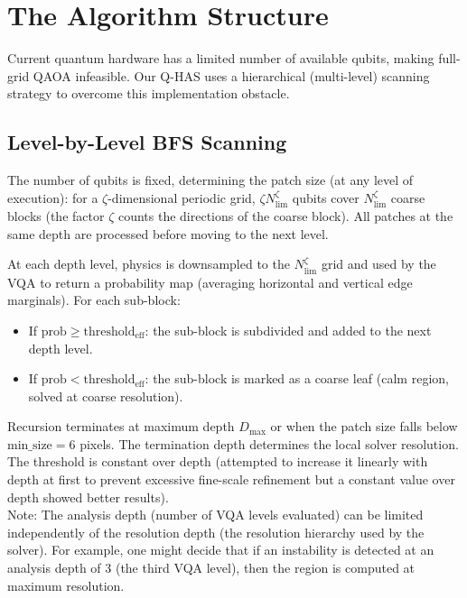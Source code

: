 \documentclass[12pt, a4paper, oneside]{report}
\begin{document}
\chapter{The Algorithm Structure}
\label{chap:algorithm}

Current quantum hardware has a limited number of available qubits, making full-grid QAOA infeasible. Our Q-HAS uses a hierarchical (multi-level) scanning strategy to overcome this implementation obstacle.

\section{Level-by-Level BFS Scanning}

The number of qubits is fixed, determining the patch size (at any level of execution): for a $\zeta$-dimensional periodic grid, $\zeta N_{\text{lim}}^{\zeta}$ qubits cover $N_{\text{lim}}^{\zeta}$ coarse blocks (the factor $\zeta$ counts the directions of the coarse block). All patches at the same depth are processed before moving to the next level.

At each depth level, physics is downsampled to the $N_{\text{lim}}^\zeta$ grid and used by the VQA to return a probability map (averaging horizontal and vertical edge marginals). For each sub-block:
\begin{itemize}
    \item If $\text{prob} \geq \text{threshold}_{\text{eff}}$: the sub-block is subdivided and added to the next depth level.
    \item If $\text{prob} < \text{threshold}_{\text{eff}}$: the sub-block is marked as a coarse leaf (calm region, solved at coarse resolution).
\end{itemize}

Recursion terminates at maximum depth $D_{\text{max}}$ or when the patch size falls below $\text{min\_size} = 6$ pixels. The termination depth determines the local solver resolution. The threshold is constant over depth (attempted to increase it linearly with depth at first to prevent excessive fine-scale refinement but a constant value over depth showed better results).\\

Note: The analysis depth (number of VQA levels evaluated) can be limited independently of the resolution depth (the resolution hierarchy used by the solver). For example, one might decide that if an instability is detected at an analysis depth of 3 (the third VQA level), then the region is computed at maximum resolution.
\end{document}
